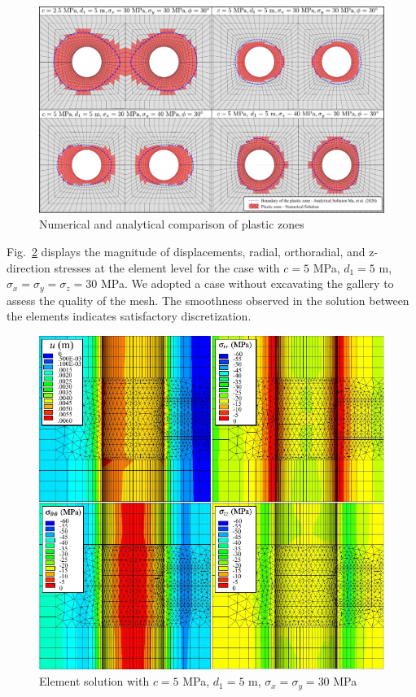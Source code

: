 \documentclass[a4paper,fleqn]{cas-sc}
\begin{document}
\begin{figure}[h!]
	\centering
	\includegraphics[scale=0.7]{MA_FIG1.pdf}
	\caption{Numerical and analytical comparison of plastic zones}
	\label{MA_FIG1}
\end{figure}
\FloatBarrier

Fig.~\ref{MA_FIG2} displays the magnitude of displacements, radial, orthoradial, and z-direction stresses at the element level  for the case with $c=5$ MPa, $d_1=5$ m, $\sigma_x = \sigma_y = \sigma_z = 30$ MPa. We adopted a case without excavating the gallery to assess the quality of the mesh. The smoothness observed in the solution between the elements indicates satisfactory discretization.

\begin{figure}[h!]
	\centering
	\includegraphics[scale=1]{MA_FIG2.pdf}
	\caption{Element solution with $c=5$ MPa, $d_1=5$ m, $\sigma_x = \sigma_y = 30$ MPa}
	\label{MA_FIG2}
\end{figure}
\FloatBarrier
\end{document}
